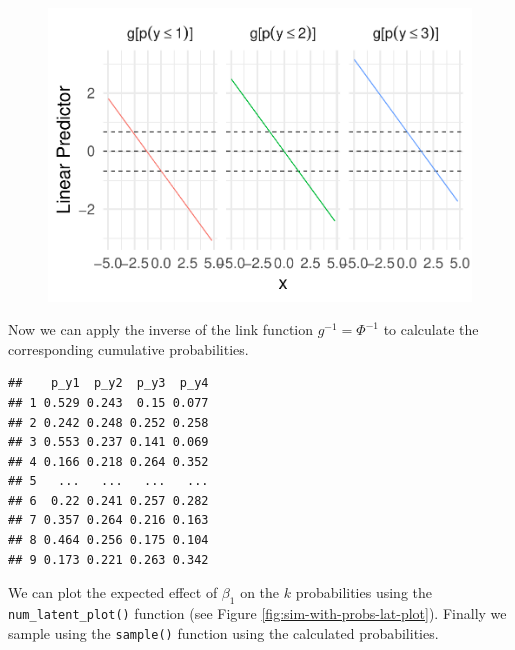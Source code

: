 \documentclass[
  man,floatsintext]{apa6}
\begin{document}
\begin{figure}

{\centering \includegraphics{paper-new_files/figure-latex/unnamed-chunk-11-1} 

}

\caption{ }\label{fig:unnamed-chunk-11}
\end{figure}

\normalsize

Now we can apply the inverse of the link function \(g^{-1} = \Phi^{-1}\) to calculate the corresponding cumulative probabilities.

\scriptsize

\normalsize

\scriptsize

\begin{verbatim}
##    p_y1  p_y2  p_y3  p_y4
## 1 0.529 0.243  0.15 0.077
## 2 0.242 0.248 0.252 0.258
## 3 0.553 0.237 0.141 0.069
## 4 0.166 0.218 0.264 0.352
## 5   ...   ...   ...   ...
## 6  0.22 0.241 0.257 0.282
## 7 0.357 0.264 0.216 0.163
## 8 0.464 0.256 0.175 0.104
## 9 0.173 0.221 0.263 0.342
\end{verbatim}

\normalsize

We can plot the expected effect of \(\beta_1\) on the \(k\) probabilities using the \texttt{num\_latent\_plot()} function (see Figure \ref{fig:sim-with-probs-lat-plot}). Finally we sample using the \texttt{sample()} function using the calculated probabilities.

\scriptsize
\end{document}
